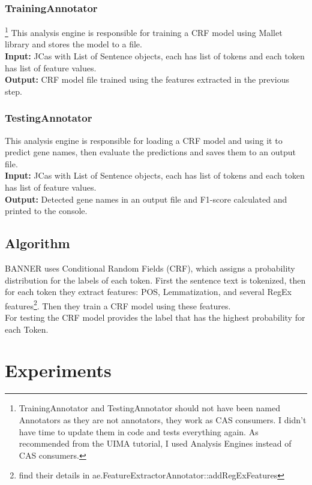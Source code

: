 \documentclass{article}
\begin{document}
\subsubsection{TrainingAnnotator}
\footnote{TrainingAnnotator and TestingAnnotator should not have been named Annotators as they are not annotators, they work as CAS consumers. I didn't have time to update them in code and tests everything again. As recommended from the UIMA tutorial, I used Analysis Engines instead of CAS consumers.}
This analysis engine is responsible for training a CRF model using Mallet library and stores the model to a file.\\
\textbf{Input:} JCas with List of Sentence objects, each has list of tokens and each token has list of feature values.\\
\textbf{Output:} CRF model file trained using the features extracted in the previous step.\\

\subsubsection{TestingAnnotator}
 This analysis engine is responsible for loading a CRF model and using it to predict gene names, then evaluate the predictions and saves them to an output file.\\
\textbf{Input:} JCas with List of Sentence objects, each has list of tokens and each token has list of feature values.\\
\textbf{Output:} Detected gene names in an output file and F1-score calculated and printed to the console.\\


\subsection{Algorithm}
BANNER \cite{banner} uses Conditional Random Fields (CRF), which assigns a probability distribution for the labels of each token. First the sentence text is tokenized, then for each token they extract features: POS, Lemmatization, and several RegEx features\footnote{find their details in ae.FeatureExtractorAnnotator::addRegExFeatures}. Then they train a CRF model using these features.\\

For testing the CRF model provides the label that has the highest probability for each Token.
\section{Experiments}
\end{document}
